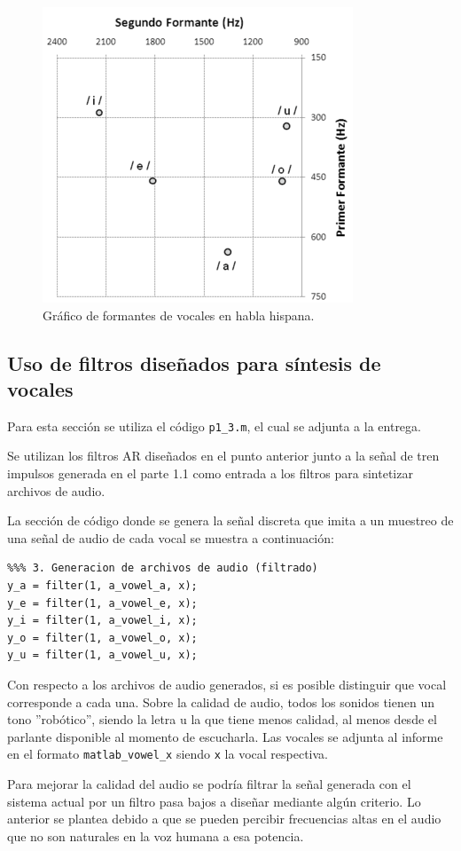 \begin{figure}[H]
    \centering
    \includegraphics[width = .5\linewidth]{figures/350px-Spanish_Vowel_Formants_Bradlow1995.png}
    \caption{Gráfico de formantes de vocales en habla hispana.}
    \label{fig:p1_formantes}
\end{figure}

\subsection{Uso de filtros diseñados para síntesis de vocales}
Para esta sección se utiliza el código \texttt{p1\_3.m}, el cual se adjunta a la entrega.

Se utilizan los filtros AR diseñados en el punto anterior junto a la señal de tren impulsos generada en el parte 1.1 como entrada a los filtros para sintetizar archivos de audio.

La sección de código donde se genera la señal discreta que imita a un muestreo de una señal de audio de cada vocal se muestra a continuación:

\begin{lstlisting}
%%% 3. Generacion de archivos de audio (filtrado)
y_a = filter(1, a_vowel_a, x);
y_e = filter(1, a_vowel_e, x);
y_i = filter(1, a_vowel_i, x);
y_o = filter(1, a_vowel_o, x);
y_u = filter(1, a_vowel_u, x);
\end{lstlisting}

Con respecto a los archivos de audio generados, si es posible distinguir que vocal corresponde a cada una. Sobre la calidad de audio, todos los sonidos tienen un tono ''robótico'', siendo la letra u la que tiene menos calidad, al menos desde el parlante disponible al momento de escucharla. Las vocales se adjunta al informe en el formato \texttt{matlab\_vowel\_x} siendo \texttt{x} la vocal respectiva.

Para mejorar la calidad del audio se podría filtrar la señal generada con el sistema actual por un filtro pasa bajos a diseñar mediante algún criterio. Lo anterior se plantea debido a que se pueden percibir frecuencias altas en el audio que no son naturales en la voz humana a esa potencia. 


